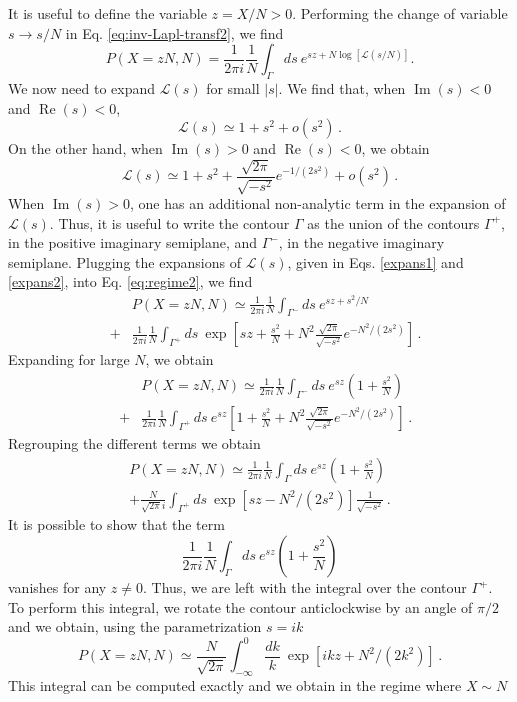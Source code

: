 \documentclass[aps,pre,twocolumn,superscriptaddress,showpacs]{revtex4-1}
\newcommand{\be}{\begin{equation}}
\newcommand{\ee}{\end{equation}}
\newcommand{\bea}{\begin{eqnarray}}
\newcommand{\eea}{\end{eqnarray}}
\newcommand{\mL}{\mathcal{L}}
\begin{document}
It is useful to define the variable $z= X/ N>0$. Performing the change of variable $s\to s/N$ in Eq. \eqref{eq:inv-Lapl-transf2}, we find
\be
P(X= z N,N) = \frac{1}{2\pi i} \frac{1}{N}
\int_{\Gamma} ds~e^{sz+N\log[\mL(s/N)]}.
\label{eq:regime2}
\ee
We now need to expand $\mL(s)$ for small $|s|$. We find that, when $\operatorname{Im}(s)<0$ and $\operatorname{Re}(s)<0$,
\be
\mL(s)\simeq 1+s^2+o(s^2)\,.
\label{expans1}
\ee
On the other hand, when $\operatorname{Im}(s)>0$ and $\operatorname{Re}(s)<0$, we obtain
\be
\mL(s)\simeq 1+s^2+\frac{\sqrt{2\pi}}{\sqrt{-s^2}}e^{-1/(2s^2)}+ o(s^2)\,.
\label{expans2}
\ee
When $\operatorname{Im}(s)>0$, one has an additional non-analytic term in the expansion of $\mL(s)$. Thus, it is useful to write the contour $\Gamma$ as the union of the contours $\Gamma^+$, in the positive imaginary semiplane, and $\Gamma^-$, in the negative imaginary semiplane. Plugging the expansions of $\mL(s)$, given in Eqs. \eqref{expans1} and \eqref{expans2}, into Eq. \eqref{eq:regime2}, we find
\bea
&&P(X= z N,N) \simeq \frac{1}{2\pi i} \frac{1}{N}
\int_{\Gamma^-} ds~e^{sz+s^2/N}\\
&+& \frac{1}{2\pi i} 
\frac{1}{N}\int_{\Gamma^+} ds~\exp\left[sz+\frac{s^2}{N} +N^2\frac{\sqrt{2\pi}}{\sqrt{-s^2}}e^{-N^2/(2 s^2)}\right]\,.\nonumber
\label{eq:regime2_2}
\eea
Expanding for large $N$, we obtain
\bea
&& P(X= z N,N) \simeq \frac{1}{2\pi i}\frac{1}{N}
\int_{\Gamma^-} ds~e^{sz}\left(1+\frac{s^2}{N}\right)\\
&+& \frac{1}{2\pi i} \frac{1}{N}
\int_{\Gamma^+} ds~e^{sz}\left[1+\frac{s^2}{N}+N^2\frac{\sqrt{2\pi}}{\sqrt{-s^2}}e^{-N^2/(2 s^2)}\right]\,.\nonumber
\label{eq:regime2_3}
\eea
Regrouping the different terms we obtain
\be
\begin{split}
P(X= z N,N) \simeq \frac{1}{2\pi i} \frac{1}{N}
\int_{\Gamma} ds~e^{sz}\left(1+\frac{s^2}{N}\right)\\
+ \frac{N}{\sqrt{2\pi} i} \int_{\Gamma^+} ds~\exp\left[ sz-N^2/(2 s^2)\right] \frac{1}{\sqrt{-s^2}}\,.
\end{split}
\ee
It is possible to show that the term
\be
\frac{1}{2\pi i} \frac{1}{N}
\int_{\Gamma} ds~e^{sz}\left(1+\frac{s^2}{N}\right)
\ee
vanishes for any $z\neq 0$. Thus, we are left with the integral over the contour $\Gamma^+$. To perform this integral, we rotate the contour anticlockwise by an angle of $\pi/2$ and we obtain, using the parametrization $s=ik$
\be
P(X=z N,N) \simeq
 \frac{N}{\sqrt{2\pi} } \int_{-\infty}^{0} \frac{dk}{k}~\exp\left[ i k z+N^2/(2 k^2)\right]\,.
\label{eq:regime2_4}
\ee
This integral can be computed exactly and we obtain in the regime where $X\sim N$
\end{document}
